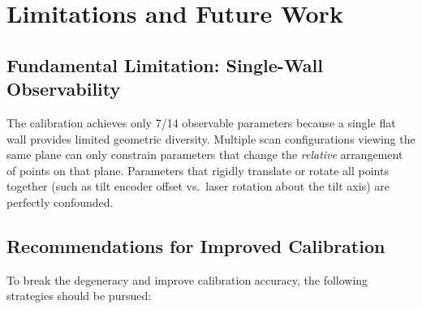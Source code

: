 \documentclass[12pt,a4paper]{article}
\begin{document}
\section{Limitations and Future Work}
\label{sec:future}

\subsection{Fundamental Limitation: Single-Wall Observability}

The calibration achieves only 7/14 observable parameters because a
single flat wall provides limited geometric diversity. Multiple scan
configurations viewing the same plane can only constrain parameters
that change the \emph{relative} arrangement of points on that plane.
Parameters that rigidly translate or rotate all points together
(such as tilt encoder offset vs.\ laser rotation about the tilt axis)
are perfectly confounded.

\subsection{Recommendations for Improved Calibration}

To break the degeneracy and improve calibration accuracy, the following
strategies should be pursued:
\end{document}
